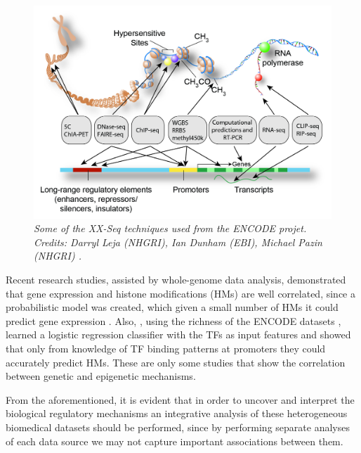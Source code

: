 \begin{figure}[h]
\begin{center}
 \includegraphics[scale = 0.15]{images/encode-seq.png}
\caption{\emph{Some of the XX-Seq techniques used from the ENCODE projet. Credits: Darryl Leja (NHGRI), Ian Dunham (EBI), Michael Pazin (NHGRI) \citep{Dunham2012}.}}
\label{seq-pic}
\end{center}
\end{figure} 

Recent research studies, assisted by whole-genome data analysis, demonstrated that gene expression and histone modifications (HMs) are well correlated, since a probabilistic model was created, which given a small number of HMs it could predict gene expression \citep{Karlic2010}. Also, \citep{Benveniste2014}, using the richness of the ENCODE datasets \citep{Dunham2012}, learned a logistic regression classifier with the TFs as input features and showed that only from knowledge of TF binding patterns at promoters they could accurately predict HMs. These are only some studies that show the correlation between genetic and epigenetic mechanisms. 

From the aforementioned, it is evident that in order to uncover and interpret the biological regulatory mechanisms an integrative analysis of these heterogeneous biomedical datasets should be performed, since by performing separate analyses of each data source we may not capture important associations between them.